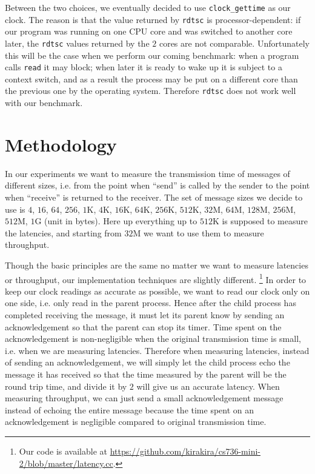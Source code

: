\documentclass{article}
\begin{document}
Between the two choices, we eventually decided to use \texttt{clock\_gettime} as our clock.
The reason is that the value returned by \texttt{rdtsc} is processor-dependent: if our program was running on one CPU core and was switched to another core later, the \texttt{rdtsc} values returned by the $2$ cores are not comparable.
Unfortunately this will be the case when we perform our coming benchmark: when a program calls \texttt{read} it may block; when later it is ready to wake up it is subject to a context switch, and as a result the process may be put on a different core than the previous one by the operating system.
Therefore \texttt{rdtsc} does not work well with our benchmark.

\section{Methodology}
\label{sec:method}
In our experiments we want to measure the transmission time of messages of different sizes, i.e. from the point when ``send'' is called by the sender to the point when ``receive'' is returned to the receiver.
The set of message sizes we decide to use is $4$, $16$, $64$, $256$, $1$K, $4$K, $16$K, $64$K, $256$K, $512$K, $32$M, $64$M, $128$M, $256$M, $512$M, $1$G (unit in bytes).
Here up everything up to $512$K is supposed to measure the latencies, and starting from $32$M we want to use them to measure throughput.

Though the basic principles are the same no matter we want to measure latencies or throughput, our implementation techniques are slightly different.
\footnote{Our code is available at \url{https://github.com/kirakira/cs736-mini-2/blob/master/latency.cc}.}
In order to keep our clock readings as accurate as possible, we want to read our clock only on one side, i.e. only read in the parent process.
Hence after the child process has completed receiving the message, it must let its parent know by sending an acknowledgement so that the parent can stop its timer.
Time spent on the acknowledgement is non-negligible when the original transmission time is small, i.e. when we are measuring latencies.
Therefore when measuring latencies, instead of sending an acknowledgement, we will simply let the child process echo the message it has received so that the time measured by the parent will be the round trip time, and divide it by $2$ will give us an accurate latency.
When measuring throughput, we can just send a small acknowledgement message instead of echoing the entire message because the time spent on an acknowledgement is negligible compared to original transmission time.
\end{document}
